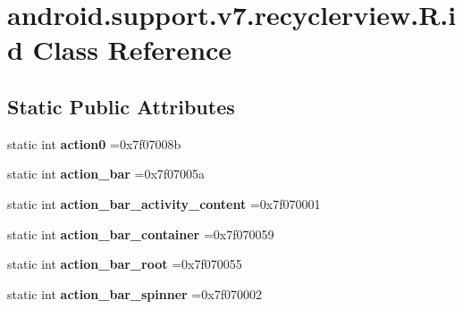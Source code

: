 \hypertarget{classandroid_1_1support_1_1v7_1_1recyclerview_1_1R_1_1id}{}\section{android.\+support.\+v7.\+recyclerview.\+R.\+id Class Reference}
\label{classandroid_1_1support_1_1v7_1_1recyclerview_1_1R_1_1id}
\subsection*{Static Public Attributes}
\begin{DoxyCompactItemize}
\item 
\mbox{\label{classandroid_1_1support_1_1v7_1_1recyclerview_1_1R_1_1id_a7f58503e2a3a99ba6ede24cb81547818}} 
static int {\bfseries action0} =0x7f07008b
\item 
\mbox{\label{classandroid_1_1support_1_1v7_1_1recyclerview_1_1R_1_1id_a0b3cd9cc6d307e42c1ed68b7057e4fab}} 
static int {\bfseries action\+\_\+bar} =0x7f07005a
\item 
\mbox{\label{classandroid_1_1support_1_1v7_1_1recyclerview_1_1R_1_1id_af93ce81d1c486d6a600957e76b700cc1}} 
static int {\bfseries action\+\_\+bar\+\_\+activity\+\_\+content} =0x7f070001
\item 
\mbox{\label{classandroid_1_1support_1_1v7_1_1recyclerview_1_1R_1_1id_a2d8dfdb3e379852d3df9bb3b7fe145f5}} 
static int {\bfseries action\+\_\+bar\+\_\+container} =0x7f070059
\item 
\mbox{\label{classandroid_1_1support_1_1v7_1_1recyclerview_1_1R_1_1id_a5a09683695dd7f0b72aaad82f41f37e2}} 
static int {\bfseries action\+\_\+bar\+\_\+root} =0x7f070055
\item 
\mbox{\label{classandroid_1_1support_1_1v7_1_1recyclerview_1_1R_1_1id_aac8a8326c98318387be08b5d0bfb746a}} 
static int {\bfseries action\+\_\+bar\+\_\+spinner} =0x7f070002

\end{DoxyCompactItemize}
